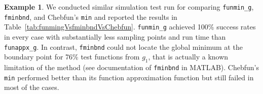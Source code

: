 \documentclass[review]{elsarticle}
\newcommand{\abstol}{\varepsilon}
\theoremstyle{definition}
\newtheorem{exmp}{Example}
\newcommand{\funappxg}{\texttt{funappx\_g}\xspace}
\newcommand{\funming}{\texttt{funmin\_g\xspace}}
\newcommand{\fminbnd}{\texttt{fminbnd\xspace}}
\newcommand{\integralg}{\texttt{integral\_g\xspace}}
\begin{document}
\begin{exmp}
We conducted similar simulation test run for comparing \funming, \fminbnd, and
Chebfun's \texttt{min} and reported the results in
Table~\ref{tab:funmingVsfminbndVsChebfun}. \funming{} achieved 100\%
success rates in every case with substantially less sampling points and run time than \funappxg.
In contrast, \fminbnd{} could not locate the global
minimum at the boundary point for 76\% test functions from $g_1$, that is actually a known
limitation of the method (see documentation of \fminbnd{} in MATLAB). Chebfun's
{\tt min} performed better than its function approximation function but still failed in most of the cases.

\end{exmp}


\begin{comment}
\begin{exmp}
In this example, we consider the function $f_4(x) = sin(10 \pi x^4) + x$, which
is increasing oscillating over the interval $[0,2]$. We use \funappxg, \funming,
and \integralg to approximate the function, locate its global minimum, and
estimate its integral with $\abstol = 10^{-8}$. With $1,972,359$ points,
\funappxg can approximate $f_4$ uniformly accurate as shown in
Figure~\ref{f4fig}(a). The true global minimum is $(0.6212340312,
-0.3782149854)$ and the absolute approximation error of \funming using
$n=2,022,621$ points is $(1.4\times 10^{-7}, 4.7\times 10^{-11})$. The integral
$\int_{0}^{2} f_4 (x) dx = 2.145517314$ and the approximation error of
\integralg is $4.7\times10^{-10}$ using $4,965,641$ points.

\begin{figure}[bt]
\centering
\texttt{[image: figure/f4\_funappx\_error.eps]} \hspace{-5ex}
\texttt{[image: figure/f4\_funmin\_g.eps]}
\caption{The example $f_4$ with errors of interpolants from \funappxg (left) and
minimum found by \funming (right).}
\label{f4fig}
\end{figure}
\end{exmp}
\end{comment}


\begin{comment}
Our algorithm is readily extensible to the following complex-valued function.
\begin{exmp}
This example is taken from MATLAB's documentation for \texttt{interp1}. Define
the complex valued function $v(x) = 5x + x^2 i$ for $x \in [1,10]$. It is clear
that the real part of $v$ is $5x$ and the imaginary part is $x^2$. We could
apply \funappxg to approximate the two parts separately. However, it is
unnecessary.
\end{exmp}
\end{comment}
\end{document}
